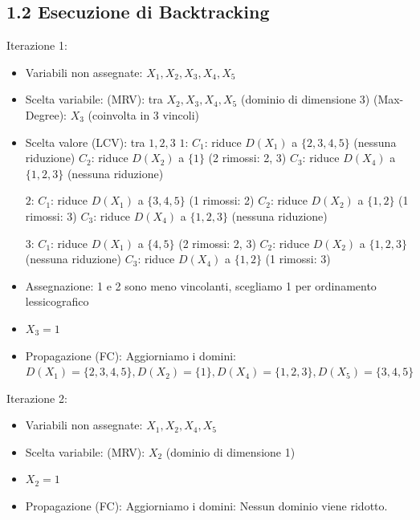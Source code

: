 \documentclass[a4paper,11pt]{article}
\begin{document}
\subsection*{1.2 Esecuzione di Backtracking}
\noindent Iterazione 1:
\begin{itemize}
  \item Variabili non assegnate: {$X_1, X_2, X_3, X_4, X_5$}
  \item Scelta variabile:
  \subitem (MRV): tra $X_2, X_3, X_4, X_5$ (dominio di dimensione 3)
  \subitem (Max-Degree): $X_3$ (coinvolta in 3 vincoli)
  \item Scelta valore (LCV): tra $1, 2, 3$
  \subitem $1$: 
  \subsubitem $C_1$: riduce $D(X_1)$ a $\{2, 3, 4, 5\}$ (nessuna riduzione)
  \subsubitem $C_2$: riduce $D(X_2)$ a $\{1\}$ (2 rimossi: 2, 3)
  \subsubitem $C_3$: riduce $D(X_4)$ a $\{1, 2, 3\}$ (nessuna riduzione)

  \subitem $2$: 
  \subsubitem $C_1$: riduce $D(X_1)$ a $\{3, 4, 5\}$ (1 rimossi: 2)
  \subsubitem $C_2$: riduce $D(X_2)$ a $\{1, 2\}$ (1 rimossi: 3)
  \subsubitem $C_3$: riduce $D(X_4)$ a $\{1, 2, 3\}$ (nessuna riduzione)
 
  \subitem $3$:
  \subsubitem $C_1$: riduce $D(X_1)$ a $\{4, 5\}$ (2 rimossi: 2, 3)
  \subsubitem $C_2$: riduce $D(X_2)$ a $\{1, 2, 3\}$ (nessuna riduzione)
  \subsubitem $C_3$: riduce $D(X_4)$ a $\{1, 2\}$ (1 rimossi: 3)
  \item Assegnazione: 1 e 2 sono meno vincolanti, scegliamo 1 per ordinamento lessicografico
  \item $X_3 = 1$
  \item Propagazione (FC): Aggiorniamo i domini: 
  \subitem $D(X_1) = \{2, 3, 4, 5\}, D(X_2) = \{1\}, D(X_4) = \{1, 2, 3\}, D(X_5) = \{3, 4, 5\}$    

\end{itemize}


\noindent Iterazione 2:
\begin{itemize}
  \item Variabili non assegnate: {$X_1, X_2, X_4, X_5$}
  \item Scelta variabile:
  \subitem (MRV): $X_2$ (dominio di dimensione 1)
  \item $X_2 = 1$
  \item Propagazione (FC): Aggiorniamo i domini: Nessun dominio viene ridotto.
\end{itemize}
\end{document}
